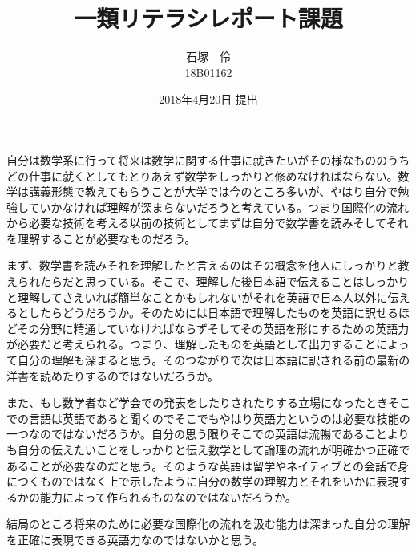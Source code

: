 \documentclass{jsarticle}
\begin{document}
\pagestyle{empty}
\title{一類リテラシレポート課題}
\author{石塚　伶\\18B01162}
\date{2018年4月20日 提出}
\maketitle
\large{自分は数学系に行って将来は数学に関する仕事に就きたいがその様なもののうちどの仕事に就くとしてもとりあえず数学をしっかりと修めなければならない。数学は講義形態で教えてもらうことが大学では今のところ多いが、やはり自分で勉強していかなければ理解が深まらないだろうと考えている。つまり国際化の流れから必要な技術を考える以前の技術としてまずは自分で数学書を読みそしてそれを理解することが必要なものだろう。

まず、数学書を読みそれを理解したと言えるのはその概念を他人にしっかりと教えられたらだと思っている。そこで、理解した後日本語で伝えることはしっかりと理解してさえいれば簡単なことかもしれないがそれを英語で日本人以外に伝えるとしたらどうだろうか。そのためには日本語で理解したものを英語に訳せるほどその分野に精通していなければならずそしてその英語を形にするための英語力が必要だと考えられる。つまり、理解したものを英語として出力することによって自分の理解も深まると思う。そのつながりで次は日本語に訳される前の最新の洋書を読めたりするのではないだろうか。

また、もし数学者など学会での発表をしたりされたりする立場になったときそこでの言語は英語であると聞くのでそこでもやはり英語力というのは必要な技能の一つなのではないだろうか。自分の思う限りそこでの英語は流暢であることよりも自分の伝えたいことをしっかりと伝え数学として論理の流れが明確かつ正確であることが必要なのだと思う。そのような英語は留学やネイティブとの会話で身につくものではなく上で示したように自分の数学の理解力とそれをいかに表現するかの能力によって作られるものなのではないだろうか。

結局のところ将来のために必要な国際化の流れを汲む能力は深まった自分の理解を正確に表現できる英語力なのではないかと思う。}
\end{document}
